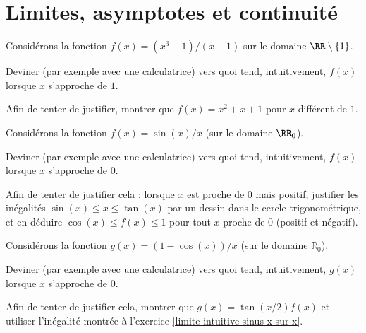 \documentclass[12pt,french,oneside,a4paper]{memoir} %
\begin{document}
\chapter{Limites, asymptotes et continuité}
\begin{exo}
  Considérons la fonction $f(x) = (x^3 - 1)/(x-1)$ sur le domaine $\RR\setminus\{1\}$.

  Deviner (par exemple avec une calculatrice) vers quoi tend, intuitivement, \(f(x)\) lorsque \(x\) s'approche de \(1\).
   
  Afin de tenter de justifier, montrer que $f(x) = x^2 + x + 1$ pour \(x\) différent de \(1\).
\end{exo}
\begin{exo}\label{limite intuitive sinus x sur x}
  Considérons la fonction $f(x) = \sin(x)/x$ (sur le domaine $\RR_0$).

  Deviner (par exemple avec une calculatrice) vers quoi tend, intuitivement, \(f(x)\) lorsque \(x\) s'approche de \(0\).
   
  Afin de tenter de justifier cela : lorsque \(x\) est proche de \(0\) mais positif, justifier les inégalités \(\sin(x) \leq x \leq \tan(x)\) par un dessin dans le cercle trigonométrique, et en déduire \(\cos(x) \leq f(x) \leq 1\) pour tout \(x\) proche de \(0\) (positif et négatif).
\end{exo}

\begin{exo}
  Considérons la fonction $g(x) = (1 - \cos(x))/x$ (sur le domaine $\mathbb R_0$).

  Deviner (par exemple avec une calculatrice) vers quoi tend, intuitivement, \(g(x)\) lorsque \(x\) s'approche de \(0\).
   
  Afin de tenter de justifier cela, montrer que $g(x) = \tan(x/2) f(x)$ et utiliser l'inégalité montrée à l'exercice \ref{limite intuitive sinus x sur x}.
\end{exo}
\end{document}
